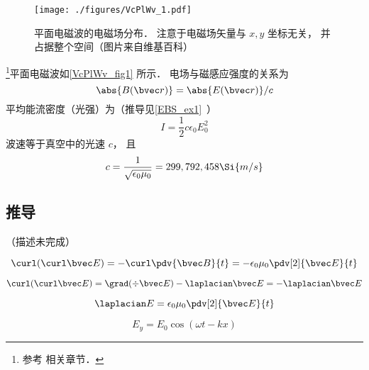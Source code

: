 

\begin{figure}[ht]
\centering
\texttt{[image: ./figures/VcPlWv\_1.pdf]}
\caption{平面电磁波的电磁场分布． 注意于电磁场矢量与 $x, y$ 坐标无关， 并占据整个空间（图片来自维基百科）} \label{VcPlWv_fig1}
\end{figure}

\footnote{参考 \cite{GriffE} 相关章节．}平面电磁波如\autoref{VcPlWv_fig1} 所示． 电场与磁感应强度的关系为
\begin{equation}
\abs{B(\bvec r)} = \abs{E(\bvec r)}/c
\end{equation}
平均能流密度（光强）为（推导见\autoref{EBS_ex1}~）
\begin{equation}
I = \frac12 c\epsilon_0 E_0^2
\end{equation}
波速等于真空中的光速 $c$， 且
\begin{equation}\label{VcPlWv_eq1}
c = \frac{1}{\sqrt{\epsilon_0\mu_0}} = 299,792,458 \Si{m/s}
\end{equation}

\subsection{推导}
（描述未完成）

\begin{equation}
\curl(\curl \bvec E) = -\curl\pdv{\bvec B}{t} = -\epsilon_0\mu_0 \pdv[2]{\bvec E}{t}
\end{equation}

\begin{equation}
\curl(\curl \bvec E) = \grad(\div \bvec E) - \laplacian \bvec E = - \laplacian \bvec E
\end{equation}

\begin{equation}
\laplacian E = \epsilon_0 \mu_0 \pdv[2]{\bvec E}{t}
\end{equation}

\begin{equation}
E_y = E_0\cos(\omega t - kx)
\end{equation}
